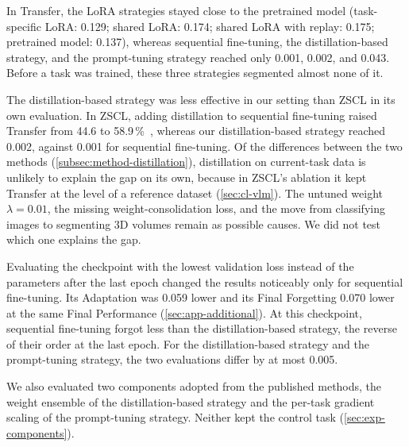 In Transfer, the LoRA strategies stayed close to the pretrained model (task-specific LoRA: 0.129; shared LoRA: 0.174; shared LoRA with replay: 0.175; pretrained model: 0.137), whereas sequential fine-tuning, the distillation-based strategy, and the prompt-tuning strategy reached only 0.001, 0.002, and 0.043.
Before a task was trained, these three strategies segmented almost none of it.

The distillation-based strategy was less effective in our setting than ZSCL in its own evaluation.
In ZSCL, adding distillation to sequential fine-tuning raised Transfer from 44.6 to 58.9\,\%~\cite[Table~2]{zheng2023preventingzeroshottransferdegradation}, whereas our distillation-based strategy reached 0.002, against 0.001 for sequential fine-tuning.
Of the differences between the two methods (\cref{subsec:method-distillation}), distillation on current-task data is unlikely to explain the gap on its own, because in ZSCL's ablation it kept Transfer at the level of a reference dataset (\cref{sec:cl-vlm}).
The untuned weight $\lambda = 0.01$, the missing weight-consolidation loss, and the move from classifying images to segmenting 3D volumes remain as possible causes.
We did not test which one explains the gap.

Evaluating the checkpoint with the lowest validation loss instead of the parameters after the last epoch changed the results noticeably only for sequential fine-tuning.
Its Adaptation was 0.059 lower and its Final Forgetting 0.070 lower at the same Final Performance (\cref{sec:app-additional}).
At this checkpoint, sequential fine-tuning forgot less than the distillation-based strategy, the reverse of their order at the last epoch.
For the distillation-based strategy and the prompt-tuning strategy, the two evaluations differ by at most 0.005.

We also evaluated two components adopted from the published methods, the weight ensemble of the distillation-based strategy and the per-task gradient scaling of the prompt-tuning strategy.
Neither kept the control task (\cref{sec:exp-components}).

